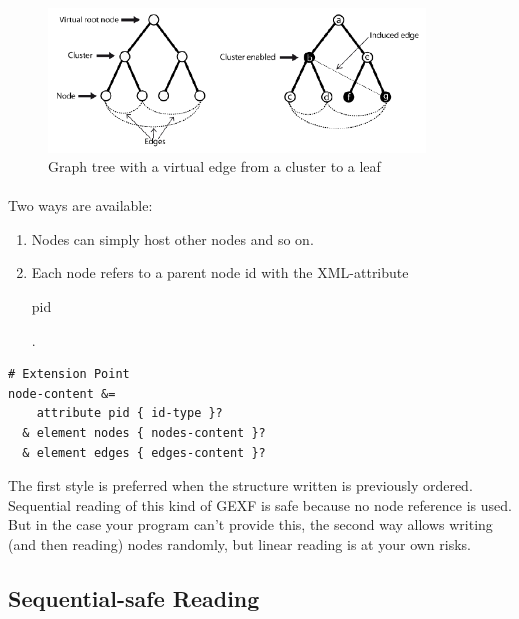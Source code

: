 \documentclass[a4paper,10pt]{article}
\begin{document}
\begin{figure}[!ht]
  \begin{center}
  \includegraphics[width=10cm,keepaspectratio=true]{res/hierarchy.png}
  \caption{Graph tree with a virtual edge from a cluster to a leaf}
  \end{center}
\end{figure}

\paragraph{}
Two ways are available:
\begin{enumerate}
 \item Nodes can simply host other nodes and so on.
 \item Each node refers to a parent node id with the XML-attribute \begin{footnotesize}pid\end{footnotesize}.
\end{enumerate}

\lstset{ style=rnc }
\begin{lstlisting}[caption={Hierarchy Specification},label=hierarchyRNC]
# Extension Point
node-content &=
    attribute pid { id-type }?
  & element nodes { nodes-content }?
  & element edges { edges-content }?
\end{lstlisting}

The first style is preferred when the structure written is previously ordered. Sequential reading of this kind of GEXF is safe because no node reference is used. But in the case your program can't provide this, the second way allows writing (and then reading) nodes randomly, but linear reading is at your own risks.

\subsection{Sequential-safe Reading}
\end{document}
